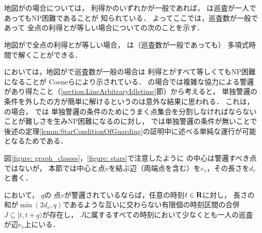 \chapter{{\graphStar}}
\label{chapter: star}

地図が{\graphStar}の場合については，
利得か{\maxIdletime}のいずれかが一般であれば，
{\patProb}は巡査が一人であってもNP困難であることが
知られている\cite[Theorems 5 and 6]{coene2011charlemagne}．
よってここでは，巡査数が一般であって
全点の利得と{\maxIdletime}が等しい場合についての次のことを示す．

\begin{theo}
  \label{theo:StarUnaryProfitAndIdletime}
  地図が{\graphStar}で全点の利得と{\maxIdletime}が等しい場合，
  {\patProb}は（巡査数が一般であっても）
  多項式時間で解くことができる．
\end{theo}

{\independentPatProb}においては，地図が{\graphStar}で巡査数が一般の場合は
利得と{\maxIdletime}がすべて等しくてもNP困難になることが
Coeneらにより示されている\cite[Theorem~10]{coene2011charlemagne}．
{\graphLine}の場合では複雑な協力による警邏があり得たこと（\ref{section:LineArbitraryIdletime}節）から考えると，
単独警邏の条件を外した{\patProb}の方が簡単に解けるというのは意外な結果に思われる．
これは，
{\graphStar}の場合，
{\independentPatProb}では
単独警邏の条件のためにうまく点集合を分割しなければならないことが難しさを生みNP困難になるのに対し，
{\patProb}では単独警邏の条件が無いことで
後述の定理\ref{lemm:StarConditionOfGuarding}の証明中に述べる単純な運行が可能となるためである．

図\ref{figure: graph_classes}，\ref{figure: stars}で注意したように
{\graphStar}の中心は警邏すべき点ではないが，
本節では中心と点$v$を結ぶ辺（両端点を含む）を$e_v$，その長さを$d_v$と書く．

\begin{lemm}
  \label{lemm:StarCostOfVertex}
  {\graphStar}において，
  {\maxIdletime}$q$の
  点$v$が警邏されているならば，任意の時刻$t \in \mathbf R$に対し，
  長さの和が$\min(2d_v, q)$であるような互いに交わらない有限個の時刻区間の合併$J \subseteq [t, t + q)$が存在し，
  $J$に属するすべての時刻において少なくとも一人の巡査が辺$e_v$上にいる．
\end{lemm}

